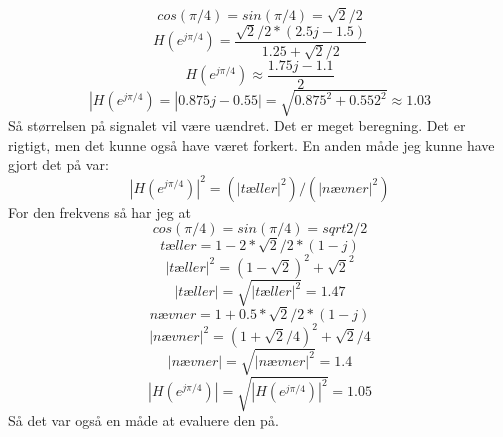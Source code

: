 \begin{rubrik}
\begin{eksamensOpgave}
\begin{UnderOpgave}
            \[cos(\pi/4) = sin(\pi/4) = \sqrt{2}/2\]
            \[H(e^{j\pi/4}) = \frac{\sqrt{2}/2 * (2.5j - 1.5)}{1.25 + \sqrt{2}/2}\] 
            \[H(e^{j\pi/4}) \approx \frac{1.75j - 1.1}{2}\] 
            \[|H(e^{j\pi/4}) = |0.875j - 0.55| = \sqrt{0.875^2 + 0.552^2} \approx 1.03\]
            Så størrelsen på signalet vil være uændret. 
            Det er meget beregning. Det er rigtigt, men det kunne også have været forkert. 
            En anden måde jeg kunne have gjort det på var: 
            \[|H(e^{j\pi/4})|^2 = (|tæller|^2)/(|nævner|^2)\]
            For den frekvens så har jeg at 
            \[cos(\pi/4) = sin(\pi/4) = sqrt{2}/2\]
            \[tæller = 1 - 2 * \sqrt{2}/2 * (1 - j)\]
            \[|tæller|^2 = (1 - \sqrt{2})^2 + \sqrt{2}^2\]
            \[|tæller| = \sqrt{|tæller|^2} = 1.47\]
            \[nævner = 1 + 0.5 * \sqrt{2}/2 * (1 - j)\]
            \[|nævner|^2 = (1 + \sqrt{2}/4)^2 + \sqrt{2}/4\]
            \[|nævner| = \sqrt{|nævner|^2} = 1.4\]
            \[|H(e^{j\pi/4})| = \sqrt{|H(e^{j\pi/4})|^2} = 1.05\]
            Så det var også en måde at evaluere den på. 
        \end{UnderOpgave}
    \end{eksamensOpgave}
    \begin{eksamensOpgave}
        

\end{eksamensOpgave}
\end{rubrik}

